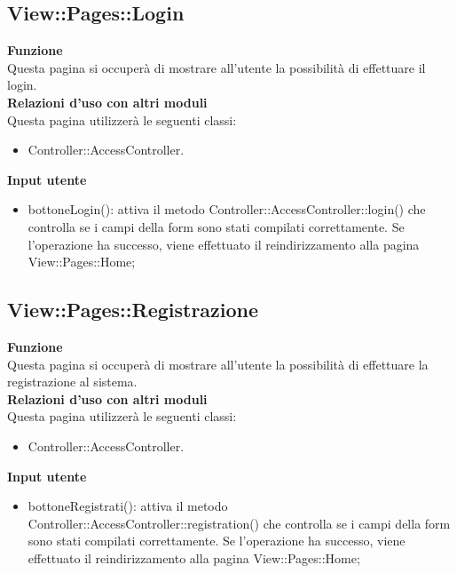{\subsection{View::Pages::Login}{
	\textbf{Funzione}\\
		\indent Questa pagina si occuperà di mostrare all'utente la possibilità di effettuare il login.\\
	\textbf{Relazioni d'uso con altri moduli}\\
		\indent Questa pagina utilizzerà le seguenti classi:
	\begin{itemize}
		\item Controller::AccessController.
	\end{itemize}
	\textbf{Input utente}
		\begin{itemize}
		\item bottoneLogin(): attiva il metodo Controller::AccessController::login() che controlla se i campi della form sono stati compilati correttamente. Se l'operazione ha successo, viene effettuato il reindirizzamento alla pagina View::Pages::Home;
	\end{itemize}
	}
	\subsection{View::Pages::Registrazione}{
	\textbf{Funzione}\\
		\indent Questa pagina si occuperà di mostrare all'utente la possibilità di effettuare la registrazione al sistema.\\
	\textbf{Relazioni d'uso con altri moduli}\\
		\indent Questa pagina utilizzerà le seguenti classi:
	\begin{itemize}
		\item Controller::AccessController.
	\end{itemize}
	\textbf{Input utente}
		\begin{itemize}
		\item bottoneRegistrati(): attiva il metodo Controller::AccessController::registration() che controlla se i campi della form sono stati compilati correttamente. Se l'operazione ha successo, viene effettuato il reindirizzamento alla pagina View::Pages::Home;
	\end{itemize}
	}
}
